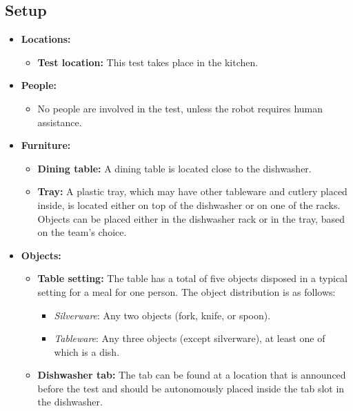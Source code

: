 \subsection*{Setup}
\begin{itemize}[nosep]
	\item \textbf{Locations:}
		\begin{itemize}
			\item \textbf{Test location:} This test takes place in the kitchen.
		\end{itemize}
	\item \textbf{People:}
		\begin{itemize}
			\item No people are involved in the test, unless the robot requires human assistance.
		\end{itemize}
	\item \textbf{Furniture:}
		\begin{itemize}
			\item \textbf{Dining table:} A dining table is located close to the dishwasher.
			\item \textbf{Tray:} A plastic tray, which may have other tableware and cutlery placed inside, is located either on top of the dishwasher or on one of the racks. Objects can be placed either in the dishwasher rack or in the tray, based on the team's choice.
		\end{itemize}
	\item \textbf{Objects:}
		\begin{itemize}
			\item \textbf{Table setting:} The table has a total of five objects disposed in a typical setting for a meal for one person.
			The object distribution is as follows:
			\begin{itemize}[nosep]
				\item\textit{Silverware}: Any two objects (fork, knife, or spoon).
				\item\textit{Tableware}: Any three objects (except silverware), at least one of which is a dish.
			\end{itemize}
			\item \textbf{Dishwasher tab:} The tab can be found at a location that is announced before the test and should be autonomously placed inside the tab slot in the dishwasher.
		\end{itemize}
\end{itemize}


